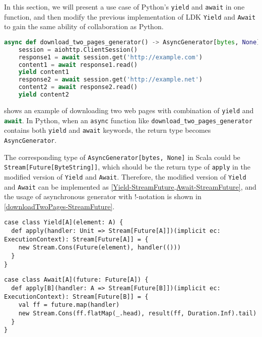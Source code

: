 In this section, we will present a use case of Python's \lstinline{yield} and \lstinline{await} in one function, and then modify the previous implementation of LDK \lstinline{Yield} and \lstinline{Await} to gain the same ability of collaboration as Python.

\begin{lstlisting}[language=Python,style=Python3,caption={Downloading two web pages as an asynchronous generator in Python},label={download_two_pages_generator-Python}]
async def download_two_pages_generator() -> AsyncGenerator[bytes, None]:
    session = aiohttp.ClientSession()
    response1 = await session.get('http://example.com')
    content1 = await response1.read()
    yield content1
    response2 = await session.get('http://example.net')
    content2 = await response2.read()
    yield content2
\end{lstlisting}

 shows an example of downloading two web pages with combination of \lstinline{yield} and \lstinline[language=Python,style=Python3]{await}. In Python, when an \lstinline{async} function like \lstinline{download_two_pages_generator} contains both \lstinline{yield} and \lstinline{await} keywords, the return type becomes \lstinline{AsyncGenerator}.

The corresponding type of \lstinline{AsyncGenerator[bytes, None]} in Scala could be \lstinline{Stream[Future[ByteString]]}, which should be the return type of \lstinline{apply} in the modified version of \lstinline{Yield} and \lstinline{Await}. Therefore, the modified version of \lstinline{Yield} and \lstinline{Await} can be implemented as \cref{Yield-StreamFuture,Await-StreamFuture}, and the usage of asynchronous generator with !-notation is shown in \cref{downloadTwoPages-StreamFuture}.

\begin{lstlisting}[caption={Implementing modified version of \lstinline{Yield} LDK for creating asynchronous generators},label={Yield-StreamFuture}]
case class Yield[A](element: A) {
  def apply(handler: Unit => Stream[Future[A]])(implicit ec: ExecutionContext): Stream[Future[A]] = {
    new Stream.Cons(Future(element), handler(()))
  }
}
\end{lstlisting}

\begin{lstlisting}[caption={Implementing a modified version of \lstinline{Await} LDK for creating asynchronous generators},label={Await-StreamFuture}]
case class Await[A](future: Future[A]) {
  def apply[B](handler: A => Stream[Future[B]])(implicit ec: ExecutionContext): Stream[Future[B]] = {
    val ff = future.map(handler)
    new Stream.Cons(ff.flatMap(_.head), result(ff, Duration.Inf).tail)
  }
}
\end{lstlisting}
  

